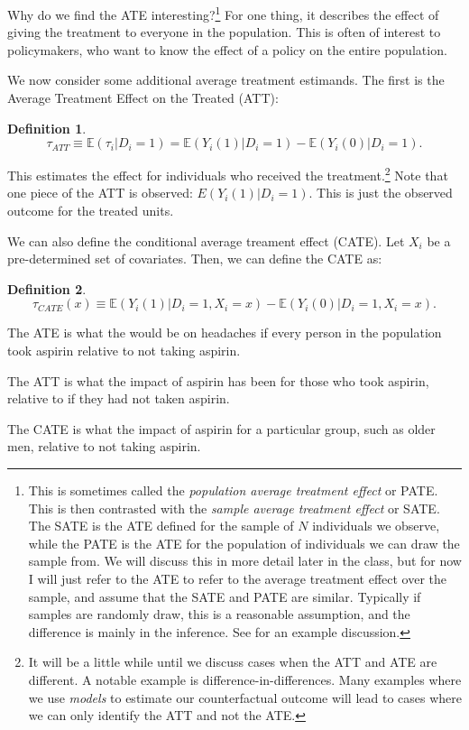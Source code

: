 \documentclass{tufte-handout}
\theoremstyle{break}
\newtheorem{defN}{Definition}
\newcommand{\continuation}{??}
\newenvironment{continueexample}[1]
 {\renewcommand{\continuation}{\ref{#1}}\excont[continued]}
 {\endexcont}
\newcommand{\E}{\mathbb{E}}
\begin{document}
Why do we find the ATE interesting?\footnote{This is sometimes called the \emph{population average treatment effect} or PATE. This is then contrasted with the \emph{sample average treatment effect} or SATE. The SATE is the ATE defined for the sample of $N$ individuals we observe, while the PATE is the ATE for the population of individuals we can draw the sample from. We will discuss this in more detail later in the class, but for now I will just refer to the ATE to refer to the average treatment effect over the  sample, and assume that the SATE and PATE are similar. Typically if samples are randomly draw, this is a reasonable assumption, and the difference is mainly in the inference. See \citet{imbens2004nonparametric} for an example discussion. } For one thing, it describes the effect of giving the treatment to everyone in the population. This is often of interest to policymakers, who want to know the effect of a policy on the entire population.

We now consider some additional average treatment estimands. The first is the Average Treatment Effect on the Treated (ATT):
\begin{defN}
  \begin{equation*}
    \tau_{ATT} \equiv \E(\tau_{i}| D_{i} = 1) = \E(Y_{i}(1) | D_{i} = 1) - \E(Y_{i}(0)| D_{i} = 1).
  \end{equation*}
\end{defN}
This estimates the effect for individuals who received the treatment.\footnote{It will be a little while until we discuss cases when the ATT and ATE are different. A notable example is difference-in-differences. Many examples where we use \emph{models} to estimate our counterfactual outcome will lead to cases where we can only identify the ATT and not the ATE.} Note that one piece of the ATT is observed: $E(Y_{i}(1) | D_{i} = 1)$. This is just the observed outcome for the treated units. 

We can also define the conditional average treament effect (CATE). Let $X_{i}$ be a pre-determined set of covariates. Then, we can define the CATE as:
\begin{defN}
  \begin{equation*}
    \tau_{CATE}(x) \equiv \E(Y_{i}(1) | D_{i} = 1, X_{i} = x) - \E(Y_{i}(0)| D_{i} = 1, X_{i} = x).
  \end{equation*}
\end{defN}


\begin{boxD}
  \begin{continueexample}{example1}
    The ATE is what the would be on headaches if every person in the population took aspirin relative to not taking aspirin.

    The ATT is what the impact of aspirin has been for those who took aspirin, relative to if they had not taken aspirin.

    The CATE is what the impact of aspirin for a particular group, such as older men, relative to not taking aspirin.
    \end{continueexample}
  \end{boxD}
\end{document}
